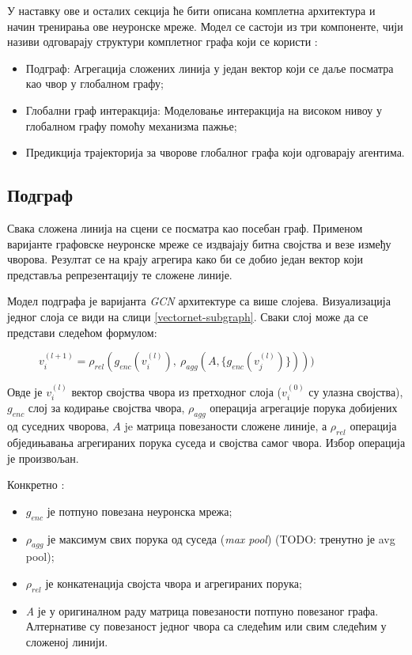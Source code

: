 \documentclass[11pt,oneside]{memoir}
\begin{document}
У наставку ове и осталих секција ће бити описана комплетна архитектура и начин тренирања ове неуронске мреже. Модел се састоји из три компоненте,
чији називи одговарају структури комплетног графа који се користи \cite{vectornet}:
\begin{itemize}
  \item Подграф: Агрегација сложених линија у један вектор који се даље посматра као чвор у глобалном графу;
  \item Глобални граф интеракција: Моделовање интеракција на високом нивоу у глобалном графу помоћу механизма пажње;
  \item Предикција трајекторија за чворове глобалног графа који одговарају агентима.
\end{itemize}

\subsection{Подграф}

Свака сложена линија на сцени се посматра као посебан граф. Применом варијанте графовске неуронске мреже
се издвајају битна својства и везе између чворова. Резултат се на крају агрегира како би се добио један вектор који представља репрезентацију
те сложене линије.

Модел подграфа је варијанта \textit{GCN} архитектуре \cite{gcn} са више слојева. Визуализација једног слоја се види на слици \ref{vectornet-subgraph}. 
Сваки слој може да се представи следећом формулом:

\begin{figure}[H]
  \centering
  $v^{(l+1)}_{i} = \rho_{rel}(g_{enc}(v^{(l)}_{i}),\ \rho_{agg}(A, \{g_{enc}(v^{(l)}_{j})\})))$
\end{figure}

Овде је $v^{(l)}_{i}$ вектор својства чвора из претходног слоја ($v^{(0)}_{i}$ су улазна својства), $g_{enc}$ слој за кодирање својства чвора, 
$\rho_{agg}$ операција агрегације порука добијених од суседних чворова, $A$ je матрица повезаности сложене линије, 
а $\rho_{rel}$ операција обједињавања агрегираних порука суседа и својства самог чвора. Избор операција је произвољан.

\noindent Конкретно \cite{vectornet}:
\begin{itemize}
  \item $g_{enc}$ је потпуно повезана неуронска мрежа;
  \item $\rho_{agg}$ је максимум свих порука од суседа (\textit{max pool}) (TODO: тренутно је avg pool);
  \item $\rho_{rel}$ је конкатенација својста чвора и агрегираних порука;
  \item \textit{A} је у оригиналном раду матрица повезаности потпуно повезаног графа. Алтернативе су повезаност једног чвора са следећим 
  или свим следећим у сложеној линији. 
\end{itemize}
\end{document}
